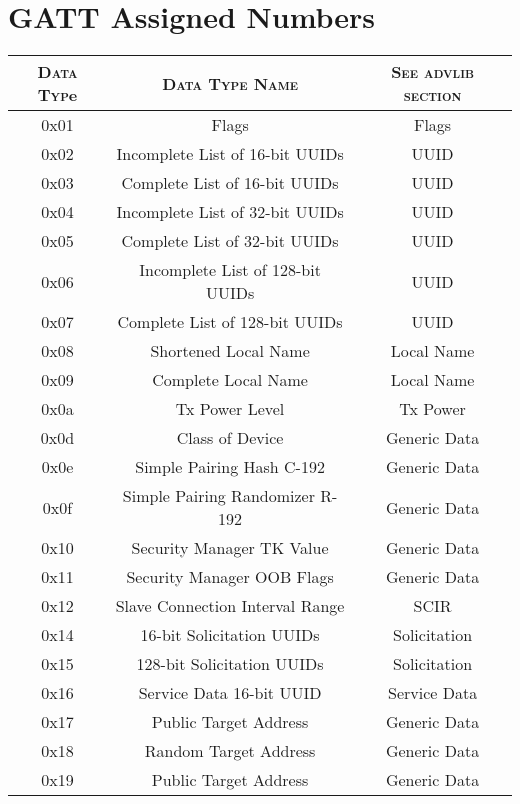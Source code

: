 \chapter{GATT Assigned Numbers}
\label{appendixA}
\thispagestyle{empty}

\begin{longtable}{c c c} 
	\hline
		\textsc{Data Typ}e &	\textsc{Data Type Name} & \textsc{See advlib section} \\ \hline
		 0x01 &	Flags &	Flags \\ \hline
		 0x02 &	Incomplete List of 16-bit UUIDs &	UUID \\ \hline
		 0x03 &	Complete List of 16-bit UUIDs &	UUID \\ \hline
		 0x04 &	Incomplete List of 32-bit UUIDs &	UUID \\ \hline
		 0x05 &	Complete List of 32-bit UUIDs &	UUID \\ \hline
		 0x06 &	Incomplete List of 128-bit UUIDs &	UUID \\ \hline
		 0x07 &	Complete List of 128-bit UUIDs &	UUID \\ \hline
		 0x08 &	Shortened Local Name &	Local Name \\ \hline
		 0x09 &	Complete Local Name &	Local Name \\ \hline
		 0x0a &	Tx Power Level &	Tx Power \\ \hline
		 0x0d &	Class of Device &	Generic Data \\ \hline
		 0x0e &	Simple Pairing Hash C-192 &	Generic Data \\ \hline
		 0x0f &	Simple Pairing Randomizer R-192 &	Generic Data \\ \hline
		 0x10 &	Security Manager TK Value &	Generic Data \\ \hline
		 0x11 &	Security Manager OOB Flags &	Generic Data \\ \hline
		 0x12 &	Slave Connection Interval Range &	SCIR \\ \hline
		 0x14 &	16-bit Solicitation UUIDs &	Solicitation \\ \hline
		 0x15 &	128-bit Solicitation UUIDs &	Solicitation \\ \hline
		 0x16 &	Service Data 16-bit UUID &	Service Data \\ \hline
		 0x17 &	Public Target Address &	Generic Data \\ \hline
		 0x18 &	Random Target Address &	Generic Data \\ \hline
		 0x19 &	Public Target Address &	Generic Data \\ \hline

\end{longtable}
